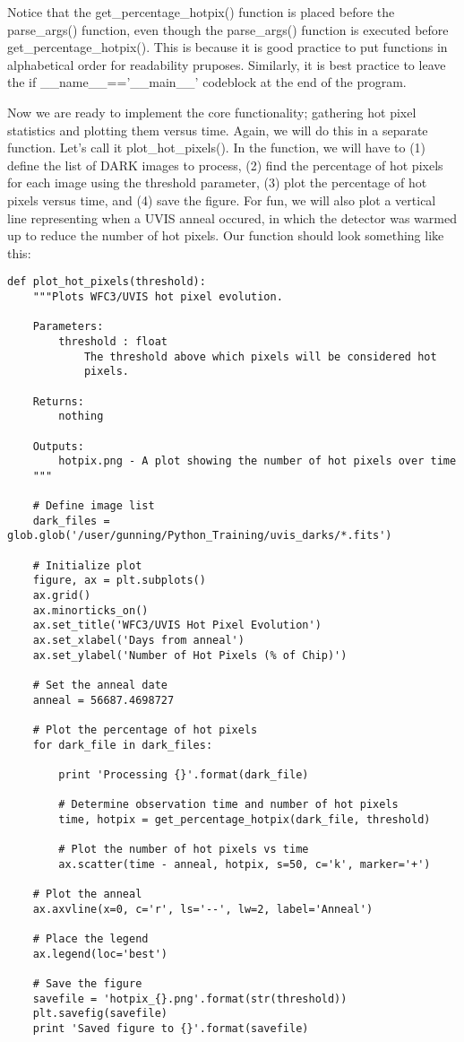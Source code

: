 Notice that the {\sf\small get\_percentage\_hotpix()} function is placed before the {\sf\small parse\_args()}
function, even though the {\sf\small parse\_args()} function is executed before {\sf\small get\_percentage\_hotpix()}.
This is because it is good practice to put functions in alphabetical order for readability
pruposes.  Similarly, it is best practice to leave the {\sf\small if \_\_name\_\_=='\_\_main\_\_'} codeblock
at the end of the program.

Now we are ready to implement the core functionality; gathering hot pixel statistics and
plotting them versus time.  Again, we will do this in a separate function.  Let's call it {\sf\small plot\_hot\_pixels()}.
In the function, we will have to (1) define the list of DARK images to process, (2) find the percentage
of hot pixels for each image using the threshold parameter, (3) plot the percentage of hot 
pixels versus time, and (4) save the figure.  For fun, we will also plot a vertical line 
representing when a UVIS anneal occured, in which the detector was warmed up to reduce the 
number of hot pixels.  Our function should look something like this:

\begin{verbatim}
def plot_hot_pixels(threshold):
    """Plots WFC3/UVIS hot pixel evolution.

    Parameters:
        threshold : float
            The threshold above which pixels will be considered hot
            pixels.

    Returns:
        nothing

    Outputs:
        hotpix.png - A plot showing the number of hot pixels over time
    """

    # Define image list
    dark_files = glob.glob('/user/gunning/Python_Training/uvis_darks/*.fits')

    # Initialize plot
    figure, ax = plt.subplots()
    ax.grid()
    ax.minorticks_on()
    ax.set_title('WFC3/UVIS Hot Pixel Evolution')
    ax.set_xlabel('Days from anneal')
    ax.set_ylabel('Number of Hot Pixels (% of Chip)')

    # Set the anneal date
    anneal = 56687.4698727

    # Plot the percentage of hot pixels
    for dark_file in dark_files:

        print 'Processing {}'.format(dark_file)

        # Determine observation time and number of hot pixels
        time, hotpix = get_percentage_hotpix(dark_file, threshold)

        # Plot the number of hot pixels vs time
        ax.scatter(time - anneal, hotpix, s=50, c='k', marker='+')

    # Plot the anneal
    ax.axvline(x=0, c='r', ls='--', lw=2, label='Anneal')

    # Place the legend
    ax.legend(loc='best')

    # Save the figure
    savefile = 'hotpix_{}.png'.format(str(threshold))
    plt.savefig(savefile)
    print 'Saved figure to {}'.format(savefile)
\end{verbatim}

